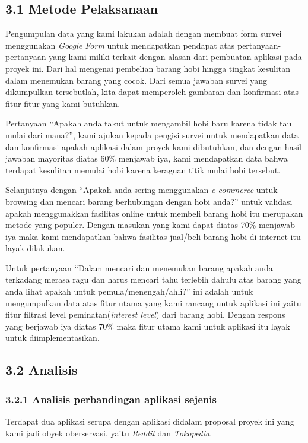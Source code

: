 \documentclass[a4paper]{article}
\begin{document}
\subsection*{3.1 Metode Pelaksanaan}


Pengumpulan data yang kami lakukan adalah dengan membuat form survei menggunakan \textit{Google Form} untuk mendapatkan pendapat atas pertanyaan-pertanyaan yang kami miliki terkait dengan alasan dari pembuatan aplikasi pada proyek ini. Dari hal mengenai pembelian barang hobi hingga tingkat kesulitan dalam menemukan barang yang cocok. Dari semua jawaban survei yang dikumpulkan tersebutlah, kita dapat memperoleh gambaran dan konfirmasi atas fitur-fitur yang kami butuhkan.


Pertanyaan “Apakah anda takut untuk mengambil hobi baru karena tidak tau mulai dari mana?”, kami ajukan kepada pengisi survei untuk mendapatkan data dan konfirmasi apakah aplikasi dalam proyek kami dibutuhkan, dan dengan hasil jawaban mayoritas diatas 60\% menjawab iya, kami mendapatkan data bahwa terdapat kesulitan memulai hobi karena keraguan titik mulai hobi tersebut.


Selanjutnya dengan “Apakah anda sering menggunakan \textit{e-commerce} untuk browsing dan mencari barang berhubungan dengan hobi anda?” untuk validasi apakah menggunakkan fasilitas online untuk membeli barang hobi itu merupakan metode yang populer. Dengan masukan yang kami dapat diatas 70\% menjawab iya maka kami mendapatkan bahwa fasilitas jual/beli barang hobi di internet itu layak dilakukan.


Untuk pertanyaan “Dalam mencari dan menemukan barang apakah anda terkadang merasa ragu dan harus mencari tahu terlebih dahulu atas barang yang anda lihat apakah untuk pemula/menengah/ahli?” ini adalah untuk mengumpulkan data atas fitur utama yang kami rancang untuk aplikasi ini yaitu fitur filtrasi level peminatan(\textit{interest level}) dari barang hobi. Dengan respons yang berjawab iya diatas 70\% maka fitur utama kami untuk aplikasi itu layak untuk diimplementasikan.

\subsection*{3.2 Analisis}

\subsubsection*{3.2.1 Analisis perbandingan aplikasi sejenis}
Terdapat dua aplikasi serupa dengan aplikasi didalam proposal proyek ini yang kami jadi obyek oberservasi, yaitu \textit{Reddit} dan \textit{Tokopedia}.
\end{document}
